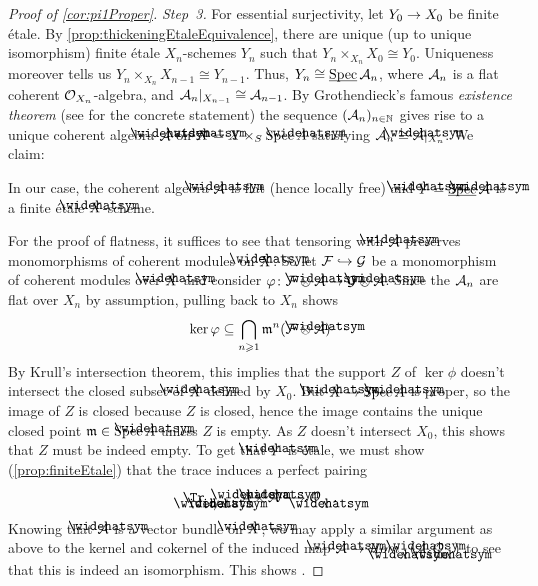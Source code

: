 \documentclass[a4paper, 10pt, oneside, DIV=9, chapterprefix=true, numbers=enddot, bibliography=totoc]{scrbook}
\begin{document}
\begin{proof}[Proof of \cref{cor:pi1Proper}]
	\emph{Step~3.} For essential surjectivity, let $Y_0\morphism X_0$ be finite étale. By \cref{prop:thickeningEtaleEquivalence}, there are unique (up to unique isomorphism) finite étale $X_n$-schemes $Y_n$ such that $Y_n\times_{X_n}X_0\cong Y_0$. Uniqueness moreover tells us $Y_n\times_{X_n}X_{n-1}\cong Y_{n-1}$. Thus, $Y_n\cong \operatorname{\underline{\smash{\mathrm{Spec}}}}\mathcal{A}_n$, where $\mathcal{A}_n$ is a flat coherent $\mathcal{O}_{X_n}$-algebra, and $\mathcal{A}_n|_{X_{n-1}}\cong \mathcal{A}_{n-1}$. By Grothendieck's famous \emph{existence theorem} (see \cite[Théorème~(5.1.4)]{egaIII} for the concrete statement) the sequence $(\mathcal{A}_n)_{n\in\mathbb{N}}$ gives rise to a unique coherent algebra $\roof{\Aa}$ on $\roof{X}=X\times_S\Spec \roof{A}$ satisfying $\Aa_n\cong \roof{\Aa}|_{X_n}$. We claim:
	\begin{alphanumerate}
		\item[\itememph{\boxtimes}] In our case, the coherent algebra $\roof{\Aa}$ is flat (hence locally free) and $\roof{Y}=\SPEC\roof{\Aa}$ is a finite étale $\roof{X}$-scheme.
	\end{alphanumerate}
	For the proof of flatness, it suffices to see that tensoring with $\roof{\Aa}$ preserves monomorphisms of coherent modules on $\roof{X}$. So let $\Ff\monomorphism \Gg$ be a monomorphism of coherent modules over $\roof{X}$ and consider $\phi\colon \Ff\otimes\roof{\Aa}\morphism \Gg\otimes\roof{\Aa}$. Since the $\mathcal{A}_n$ are flat over $X_n$ by assumption, pulling back to $X_n$ shows
	\begin{equation*}
		\ker\phi\subseteq\bigcap_{n\geq 1}\mm^n(\Ff\otimes\roof{\Aa})
	\end{equation*}
	By Krull's intersection theorem, this implies that the support $Z$ of $\ker\phi$ doesn't intersect the closed subset of $\roof{X}$ defined by $X_0$. But $\roof{X}\morphism \Spec\roof{A}$ is proper, so the image of $Z$ is closed because $Z$ is closed, hence the image contains the unique closed point $\mm\in\Spec \roof{A}$ unless $Z$ is empty. As $Z$ doesn't intersect $X_0$, this shows that $Z$ must be indeed empty. To get that $\roof{Y}$ is étale, we must show (\cref{prop:finiteEtale}) that the trace induces a perfect pairing
	\begin{equation*}
		\Tr_{\roof{\Aa}/\roof{X}}\colon \roof{\Aa}\times \roof{\Aa}\morphism\Oo_{\roof{X}}\,.
	\end{equation*}
	Knowing that $\roof{\Aa}$ is a vector bundle on $\roof{X}$, we may apply a similar argument as above to the kernel and cokernel of the induced map $\roof{\Aa}\morphism\Hhom_{\roof{X}}(\roof{\Aa},\Oo_{\roof{X}})$ to see that this is indeed an isomorphism. This shows \itememph{\boxtimes}.
	

\end{proof}
\end{document}
